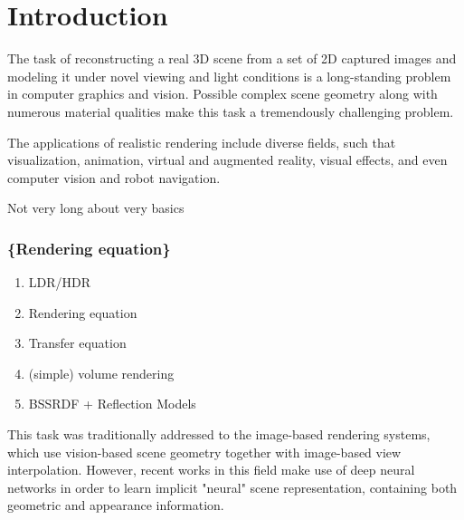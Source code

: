 \chapter{Introduction}
\label{chap:introduction}


The task of reconstructing a real 3D scene from a set of 2D captured images
and modeling it under novel viewing and light conditions
is a long-standing problem in computer graphics and vision.
Possible complex scene geometry along with numerous material qualities
make this task a tremendously challenging problem.

The applications of realistic rendering include diverse fields, such that
visualization, animation, virtual and augmented reality, visual effects,
and even computer vision and robot navigation.


Not very long about very basics
\subsection{\{Rendering equation\} }
\begin{enumerate}
    \item LDR/HDR
    \item Rendering equation
    \item Transfer equation
    \item (simple) volume rendering
    \item BSSRDF + Reflection Models
\end{enumerate}

This task was traditionally addressed to the image-based rendering systems,
which use vision-based scene geometry together with image-based view interpolation. \cite{shumandkang2000}
However, recent works in this field make use of deep neural networks
in order to learn implicit "neural" scene representation,
containing both geometric and appearance information. \cite{tewari2020state}

